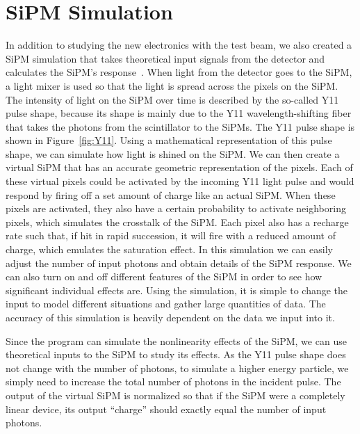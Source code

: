 \section{SiPM Simulation}

In addition to studying the new electronics with the test beam, we also created a SiPM simulation that takes theoretical input signals from the detector and calculates the SiPM's response~\cite{SiPMSimulation_github}. When light from the detector goes to the SiPM, a light mixer is used so that the light is spread across the pixels on the SiPM. The intensity of light on the SiPM over time is described by the so-called Y11 pulse shape, because its shape is mainly due to the Y11 wavelength-shifting fiber that takes the photons from the scintillator to the SiPMs. The Y11 pulse shape is shown in Figure~\ref{fig:Y11}. Using a mathematical representation of this pulse shape, we can simulate how light is shined on the SiPM. We can then create a virtual SiPM that has an accurate geometric representation of the pixels. Each of these virtual pixels could be activated by the incoming Y11 light pulse and would respond by firing off a set amount of charge like an actual SiPM. When these pixels are activated, they also have a certain probability to activate neighboring pixels, which simulates the crosstalk of the SiPM. Each pixel also has a recharge rate such that, if hit in rapid succession, it will fire with a reduced amount of charge, which emulates the saturation effect. In this simulation we can easily adjust the number of input photons and obtain details of the SiPM response. We can also turn on and off different features of the SiPM in order to see how significant individual effects are. Using the simulation, it is simple to change the input to model different situations and gather large quantities of data. The accuracy of this simulation is heavily dependent on the data we input into it.

Since the program can simulate the nonlinearity effects of the SiPM, we can use theoretical inputs to the SiPM to study its effects. As the Y11 pulse shape does not change with the number of photons, to simulate a higher energy particle, we simply need to increase the total number of photons in the incident pulse. The output of the virtual SiPM is normalized so that if the SiPM were a completely linear device, its output ``charge'' should exactly equal the number of input photons.

